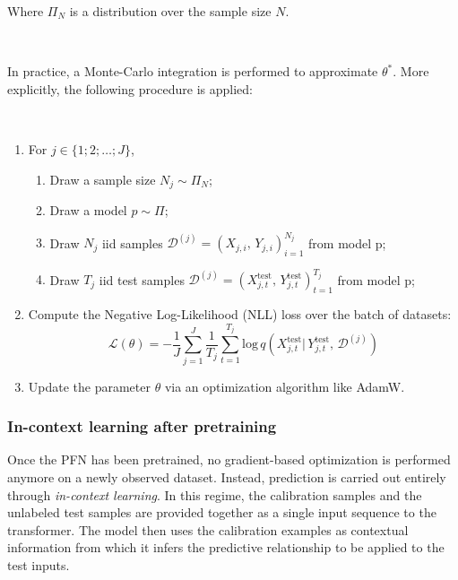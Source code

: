 \documentclass{article}
\begin{document}
Where $\Pi_N$ is a distribution over the sample size $N$.

~

In practice, a Monte-Carlo integration is performed to approximate $\theta^*$. More explicitly, the following procedure is applied:

~

\begin{enumerate}[label=\Alph*]
    \item For $j \in \{1;2;\dots;J \}$,
    
    \begin{enumerate}[label=\roman*]
        \item Draw a sample size $N_j \sim \Pi_N$;
        \item Draw a model $p \sim \Pi$;
        \item Draw $N_j$ iid samples $\mathcal{D}^{(j)} = (X_{j,i},\, Y_{j,i})_{i=1}^{N_j}$ from model p;
        \item Draw $T_j$ iid test samples $\mathcal{D}^{(j)} = (X_{j,t}^{\text{test}},\, Y_{j,t}^{\text{test}})_{t=1}^{T_j}$ from model p;
    \end{enumerate}

    \item Compute the Negative Log-Likelihood (NLL) loss over the batch of datasets: $$\mathcal{L}(\theta) = - \frac{1}{J} \sum_{j=1}^J \frac{1}{T_j} \sum_{t=1}^{T_j} \text{log} \, q(X_{j,t}^{\text{test}}|\, Y_{j,t}^{\text{test}},\, \mathcal{D}^{(j)})$$
    
    \item Update the parameter $\theta$ via an optimization algorithm like AdamW.
\end{enumerate}



\subsubsection{In-context learning after pretraining}

Once the PFN has been pretrained, no gradient-based optimization is performed anymore on a newly observed dataset. Instead, prediction is carried out entirely through \emph{in-context learning}. In this regime, the calibration samples and the unlabeled test samples are provided together as a single input sequence to the transformer. The model then uses the calibration examples as contextual information from which it infers the predictive relationship to be applied to the test inputs.
\end{document}
